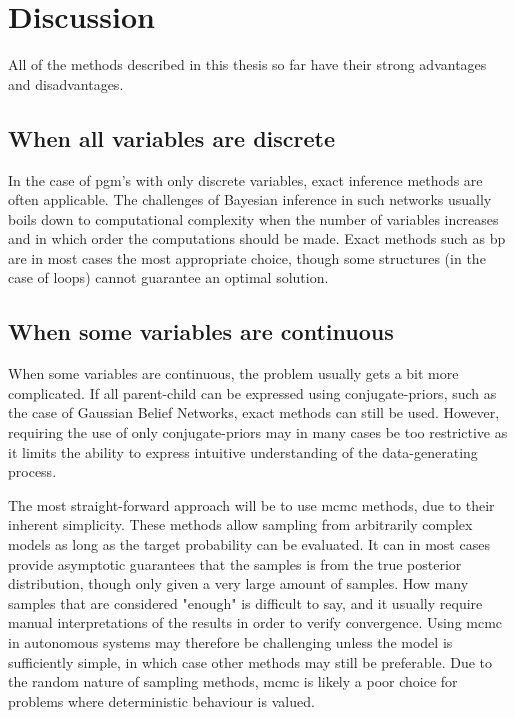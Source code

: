 \chapter{Discussion}

All of the methods described in this thesis so far have their strong advantages and disadvantages. 

\section{When all variables are discrete}
In the case of \acrshort{pgm}'s with only discrete variables, exact inference methods are often applicable. The challenges of Bayesian inference in such networks usually boils down to computational complexity when the number of variables increases and in which order the computations should be made. Exact methods such as \acrshort{bp} are in most cases the most appropriate choice, though some structures (in the case of loops) cannot guarantee an optimal solution. 

\section{When some variables are continuous}
When some variables are continuous, the problem usually gets a bit more complicated. If all parent-child can be expressed using conjugate-priors, such as the case of Gaussian Belief Networks, exact methods can still be used. However, requiring the use of only conjugate-priors may in many cases be too restrictive as it limits the ability to express intuitive understanding of the data-generating process. 

The most straight-forward approach will be to use \acrshort{mcmc} methods, due to their inherent simplicity. These methods allow sampling from arbitrarily complex models as long as the target probability can be evaluated. It can in most cases provide asymptotic guarantees that the samples is from the true posterior distribution, though only given a very large amount of samples. How many samples that are considered "enough" is difficult to say, and it usually require manual interpretations of the results in order to verify convergence. Using \acrshort{mcmc} in autonomous systems may therefore be challenging unless the model is sufficiently simple, in which case other methods may still be preferable. Due to the random nature of sampling methods, \acrshort{mcmc} is likely a poor choice for problems where deterministic behaviour is valued. 

